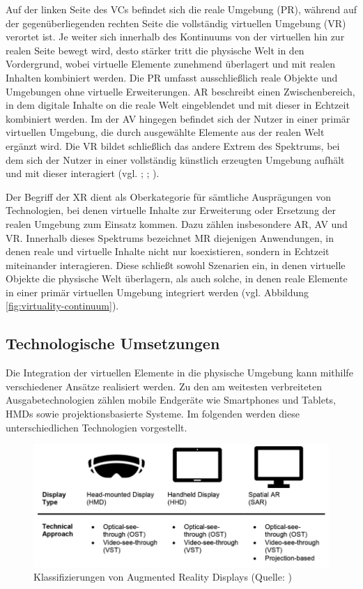 Auf der linken Seite des \ac{VC}s befindet sich die reale Umgebung (\ac{PR}), während auf der gegenüberliegenden rechten Seite die vollständig virtuellen Umgebung (\ac{VR}) verortet ist. Je weiter sich innerhalb des Kontinuums von der virtuellen hin zur realen Seite bewegt wird, desto stärker tritt die physische Welt in den Vordergrund, wobei virtuelle Elemente zunehmend überlagert und mit realen Inhalten kombiniert werden. 
Die \ac{PR} umfasst ausschließlich reale Objekte und Umgebungen ohne virtuelle Erweiterungen. \ac{AR} beschreibt einen Zwischenbereich, in dem digitale Inhalte on die reale Welt eingeblendet und mit dieser in Echtzeit kombiniert werden. Im der \ac{AV} hingegen befindet sich der Nutzer in einer primär virtuellen Umgebung, die durch ausgewählte Elemente aus der realen Welt ergänzt wird. Die \ac{VR} bildet schließlich das andere Extrem des Spektrums, bei dem sich der Nutzer in einer vollständig künstlich erzeugten Umgebung aufhält und mit dieser interagiert (vgl. \citealp[S. 3]{milgram_taxonomy_1994}; \citealp[S. 8f]{knoll_augmented_2022}; \citealp[S. 3]{zuniga_gonzalez_making_2021}).

Der Begriff der \ac{XR} dient als Oberkategorie für sämtliche Ausprägungen von Technologien, bei denen virtuelle Inhalte zur Erweiterung oder Ersetzung der realen Umgebung zum Einsatz kommen. Dazu zählen insbesondere \ac{AR}, \ac{AV} und \ac{VR}. Innerhalb dieses Spektrums bezeichnet \ac{MR} diejenigen Anwendungen, in denen reale und virtuelle Inhalte nicht nur koexistieren, sondern in Echtzeit miteinander interagieren. Diese schließt sowohl Szenarien ein, in denen virtuelle Objekte die physische Welt überlagern, als auch solche, in denen reale Elemente in einer primär virtuellen Umgebung integriert werden (vgl. Abbildung \ref{fig:virtuality-continuum}).

\subsection{Technologische Umsetzungen}
Die Integration der virtuellen Elemente in die physische Umgebung kann mithilfe verschiedener Ansätze realisiert werden. Zu den am weitesten verbreiteten Ausgabetechnologien zählen mobile Endgeräte wie Smartphones und Tablets, \ac{HMD}s sowie projektionsbasierte Systeme. Im folgenden werden diese unterschiedlichen Technologien vorgestellt.
\begin{figure}[ht]
\centering
\includegraphics[width=1\linewidth]{content/pictures/devices.PNG}
\caption{Klassifizierungen von Augmented Reality Displays (Quelle: \citealp[S. 315]{leins_comparing_2024})}
\label{fig:ar-classes}
\end{figure}

